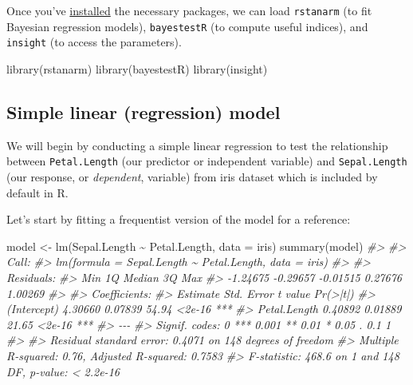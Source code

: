 \documentclass[10pt,a4paper,onecolumn]{article}
\newenvironment{Shaded}{\begin{snugshade}}{\end{snugshade}}
\newcommand{\AttributeTok}[1]{\textcolor[rgb]{0.77,0.63,0.00}{#1}}
\newcommand{\CommentTok}[1]{\textcolor[rgb]{0.56,0.35,0.01}{\textit{#1}}}
\newcommand{\FunctionTok}[1]{\textcolor[rgb]{0.00,0.00,0.00}{#1}}
\newcommand{\NormalTok}[1]{#1}
\newcommand{\OtherTok}[1]{\textcolor[rgb]{0.56,0.35,0.01}{#1}}
\newcommand{\SpecialCharTok}[1]{\textcolor[rgb]{0.00,0.00,0.00}{#1}}
\begin{document}
Once you've
\href{https://easystats.github.io/bayestestR/articles/bayestestR.html\#bayestestr-installation}{installed}
the necessary packages, we can load \texttt{rstanarm} (to fit Bayesian
regression models), \texttt{bayestestR} (to compute useful indices), and
\texttt{insight} (to access the parameters).

\begin{Shaded}
\begin{Highlighting}[]
\FunctionTok{library}\NormalTok{(rstanarm)}
\FunctionTok{library}\NormalTok{(bayestestR)}
\FunctionTok{library}\NormalTok{(insight)}
\end{Highlighting}
\end{Shaded}

\hypertarget{simple-linear-regression-model}{%
\subsection{Simple linear (regression)
model}\label{simple-linear-regression-model}}

We will begin by conducting a simple linear regression to test the
relationship between \texttt{Petal.Length} (our predictor or independent
variable) and \texttt{Sepal.Length} (our response, or \emph{dependent},
variable) from iris dataset which is included by default in R.

Let's start by fitting a frequentist version of the model for a
reference:

\begin{Shaded}
\begin{Highlighting}[]
\NormalTok{model }\OtherTok{\textless{}{-}} \FunctionTok{lm}\NormalTok{(Sepal.Length }\SpecialCharTok{\textasciitilde{}}\NormalTok{ Petal.Length, }\AttributeTok{data =}\NormalTok{ iris)}
\FunctionTok{summary}\NormalTok{(model)}
\CommentTok{\#\textgreater{} }
\CommentTok{\#\textgreater{} Call:}
\CommentTok{\#\textgreater{} lm(formula = Sepal.Length \textasciitilde{} Petal.Length, data = iris)}
\CommentTok{\#\textgreater{} }
\CommentTok{\#\textgreater{} Residuals:}
\CommentTok{\#\textgreater{}      Min       1Q   Median       3Q      Max }
\CommentTok{\#\textgreater{} {-}1.24675 {-}0.29657 {-}0.01515  0.27676  1.00269 }
\CommentTok{\#\textgreater{} }
\CommentTok{\#\textgreater{} Coefficients:}
\CommentTok{\#\textgreater{}              Estimate Std. Error t value Pr(\textgreater{}|t|)    }
\CommentTok{\#\textgreater{} (Intercept)   4.30660    0.07839   54.94   \textless{}2e{-}16 ***}
\CommentTok{\#\textgreater{} Petal.Length  0.40892    0.01889   21.65   \textless{}2e{-}16 ***}
\CommentTok{\#\textgreater{} {-}{-}{-}}
\CommentTok{\#\textgreater{} Signif. codes:  0 \textquotesingle{}***\textquotesingle{} 0.001 \textquotesingle{}**\textquotesingle{} 0.01 \textquotesingle{}*\textquotesingle{} 0.05 \textquotesingle{}.\textquotesingle{} 0.1 \textquotesingle{} \textquotesingle{} 1}
\CommentTok{\#\textgreater{} }
\CommentTok{\#\textgreater{} Residual standard error: 0.4071 on 148 degrees of freedom}
\CommentTok{\#\textgreater{} Multiple R{-}squared:   0.76,  Adjusted R{-}squared:  0.7583 }
\CommentTok{\#\textgreater{} F{-}statistic: 468.6 on 1 and 148 DF,  p{-}value: \textless{} 2.2e{-}16}
\end{Highlighting}
\end{Shaded}
\end{document}
